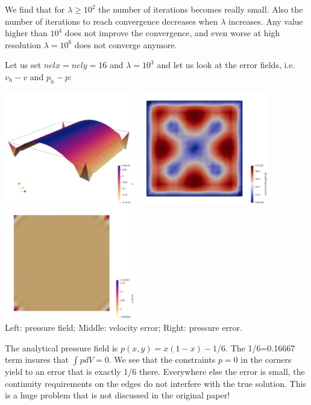 We find that for $\lambda \ge 10^2$ the number of iterations becomes really small.
Also the number of iterations to reach convergence decreases when $\lambda$ increases. 
Any value higher than $10^4$ does not improve the convergence, and even worse
at high resolution $\lambda=10^6$ does not converge anymore. 

Let us set $nelx=nely=16$ and $\lambda=10^3$ and let us look at the error fields, 
i.e. $v_h-v$ and $p_h-p$:
\begin{center}
\includegraphics[width=5.7cm]{python_codes/fieldstone_161/results/bench1/iterations/press2}
\includegraphics[width=5.7cm]{python_codes/fieldstone_161/results/bench1/iterations/vel_error}
\includegraphics[width=5.7cm]{python_codes/fieldstone_161/results/bench1/iterations/press_error}\\
{\captionfont Left: pressure field; Middle: velocity error; Right: pressure error.} 
\end{center}
The analytical pressure field is $p(x,y)=x(1-x)-1/6$. The 1/6=0.16667 term insures that $\int p dV=0$.
We see that the constraints $p=0$ in the corners yield to an error that is exactly 1/6 there. 
Everywhere else the error is small, the continuity requirements on the edges do not interfere 
with the true solution. 
This is a huge problem that is not discussed in the original paper!




